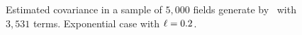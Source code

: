 \begin{figure}[H]
 \centering
 \caption{Estimated covariance in a sample of $5,000$ fields generate by \kle\ with $3,531$ terms. Exponential case with $\ell = 0.2$.}
 \label{covar_expKL2_96}
\end{figure}
